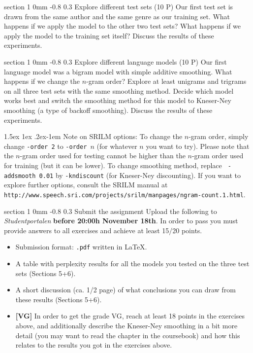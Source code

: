 \documentclass[11pt]{article}
\makeatletter
\newcommand{\newsec}[2]{\section{#1}\label{sec:#2}\noindent}
\renewcommand{\section}{\@startsection
{section}%
{1}%
{0mm}%
{-0.8\baselineskip}%
{0.3\baselineskip}%
{\bfseries\large}}%
\renewcommand{\paragraph}{%
  \@startsection{paragraph}{4}%
  {\z@}{1.5ex \@plus 1ex \@minus .2ex}{-1em}%
  {\normalfont\normalsize\bfseries}%
}\makeatother
\makeatother
\begin{document}
\newsec{Explore different test sets (10 P)}{sets}%
Our first test set is drawn from the same author and the same genre as
our training set. What happens if we apply the model to the other two
test sets? What happens if we apply the model to the training set
itself? Discuss the results of these experiments.

\newsec{Explore different language models (10 P)}{models}%
Our first language model was a bigram model with simple additive
smoothing. What happens if we change the $n$-gram order?  Explore at
least unigrams and trigrams on all three test sets with the same
smoothing method. Decide which model works best and switch the
smoothing method for this model to Kneser-Ney smoothing (a type of
backoff smoothing). Discuss the results of these experiments.

\paragraph{Note on SRILM options:} To change the $n$-gram order,
simply change {\tt -order~2} to {\tt -order~$n$} (for whatever $n$
you want to try).  Please note that the $n$-gram order used for
testing cannot be higher than the $n$-gram order used for training
(but it can be lower). To change smoothing method, replace {\tt
  -addsmooth~0.01} by {\tt -kndiscount} (for Kneser-Ney
discounting). If you want to explore further options, consult the
SRILM manual at {\small {\tt
    http://www.speech.sri.com/projects/srilm/manpages/ngram-count.1.html}}.

\newsec{Submit the assignment}{submit}%
Upload the following to {\it Studentportalen}
\textbf{before 20:00h November 18th}. In order to pass you must
provide answers to all exercises and achieve at least 15/20 points.

\begin{itemize}[noitemsep,topsep=0.2cm]
\item Submission format: \texttt{.pdf} written in \LaTeX.
\item A table with perplexity results for all the models you tested on
  the three test sets (Sections 5+6).
\item A short discussion (ca. 1/2 page) of what conclusions you can
  draw from these results (Sections 5+6).
\item \textbf{[VG]} In order to get the grade VG, reach at least 18
  points in the exercises above, and additionally describe the
  Kneser-Ney smoothing in a bit more detail (you may want to read the
  chapter in the coursebook) and how this relates to the results you
  got in the exercises above.

\end{itemize}
\end{document}
